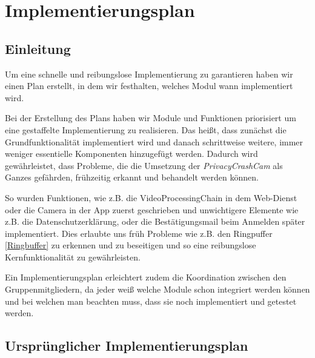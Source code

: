 \chapter{Implementierungsplan} \label{chap:Implementierungsplan}

\section{Einleitung}
Um eine schnelle und reibungslose Implementierung zu garantieren haben wir einen Plan erstellt, in dem wir festhalten, welches Modul wann implementiert wird.\par
Bei der Erstellung des Plans haben wir Module und Funktionen priorisiert um eine gestaffelte Implementierung zu realisieren. Das heißt, dass zunächst die Grundfunktionalität implementiert wird und danach schrittweise weitere, immer weniger essentielle Komponenten hinzugefügt werden. Dadurch wird gewährleistet, dass Probleme, die die Umsetzung der \textit{PrivacyCrashCam} als Ganzes gefährden, frühzeitig erkannt und behandelt werden können.\par
So wurden Funktionen, wie z.B. die VideoProcessingChain in dem Web-Dienst oder die Camera in der App zuerst geschrieben und unwichtigere Elemente wie z.B. die Datenschutzerklärung, oder die Bestätigungsmail beim Anmelden später implementiert. Dies erlaubte uns früh Probleme wie z.B. den Ringpuffer \eqref{Ringbuffer} zu erkennen und zu beseitigen und so eine reibungslose Kernfunktionalität zu gewährleisten. \par
Ein Implementierungsplan erleichtert zudem die Koordination zwischen den Gruppenmitgliedern, da jeder weiß welche Module schon integriert werden können und bei welchen man beachten muss, dass sie noch implementiert und getestet werden.

\newpage

\section{Ursprünglicher Implementierungsplan}

